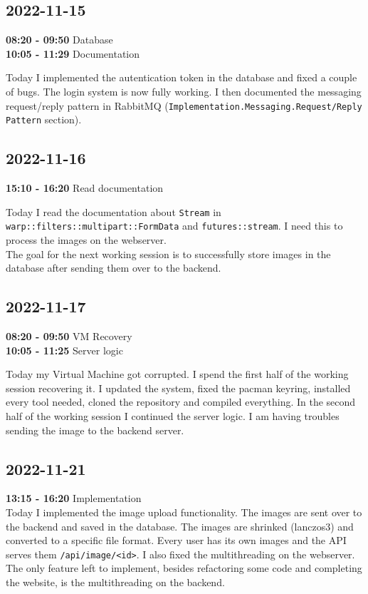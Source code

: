 \documentclass{article}
\begin{document}
\subsection{2022-11-15}

\textbf{08:20 - 09:50} Database \\
\textbf{10:05 - 11:29} Documentation

Today I implemented the autentication token in the database and fixed a couple of bugs.
The login system is now fully working. I then documented the
messaging request/reply pattern in RabbitMQ (\texttt{Implementation.Messaging.Request/Reply Pattern} section).

\subsection{2022-11-16}

\textbf{15:10 - 16:20} Read documentation

Today I read the documentation about \texttt{Stream} in 
\texttt{warp::filters::multipart::FormData} and \texttt{futures::stream}.
I need this to process the images on the webserver.
\\
The goal for the next working session
is to successfully store images in the database after sending them
over to the backend.

\subsection{2022-11-17}

\textbf{08:20 - 09:50} VM Recovery \\
\textbf{10:05 - 11:25} Server logic

Today my Virtual Machine got corrupted.
I spend the first half of the working session recovering it.
I updated the system, fixed the pacman keyring, installed every tool needed,
cloned the repository and compiled everything.
In the second half of the working session I continued the server logic.
I am having troubles sending the image to the backend server.

\subsection{2022-11-21}

\textbf{13:15 - 16:20} Implementation \\

Today I implemented the image upload functionality.
The images are sent over to the backend and saved in the database.
The images are shrinked (lanczos3) and converted to a specific file format.
Every user has its own images and the API serves them \texttt{/api/image/<id>}.
I also fixed the multithreading on the webserver.
The only feature left to implement, besides refactoring some code and completing the website,
is the multithreading on the backend.
\end{document}
